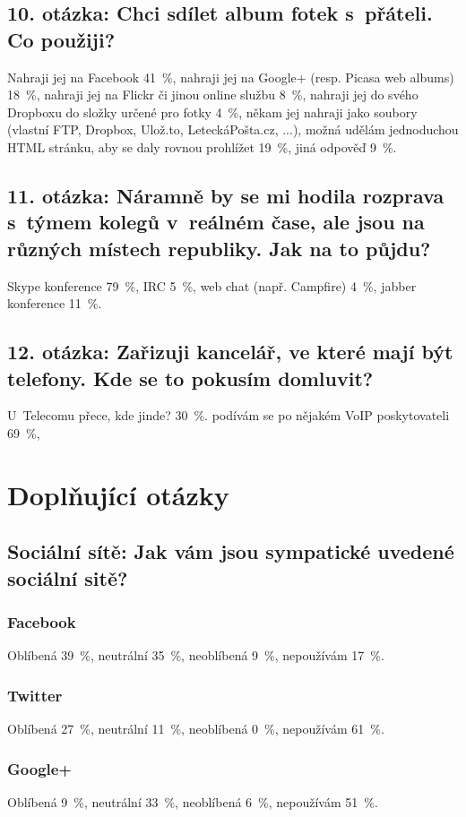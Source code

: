\documentclass[12pt,oneside,final]{fithesis2}
\begin{document}
\subsection*{10. otázka: Chci sdílet album fotek s~přáteli. Co použiji?}
Nahraji jej na Facebook 41~\%,
nahraji jej na Google+ (resp. Picasa web albums) 18~\%,
nahraji jej na Flickr či jinou online službu 8~\%,
nahraji jej do svého Dropboxu do složky určené pro fotky 4~\%,
někam jej nahraji jako soubory (vlastní FTP, Dropbox, Ulož.to, LeteckáPošta.cz, ...), možná udělám jednoduchou HTML stránku, aby se daly rovnou prohlížet 19~\%,
jiná odpověď 9~\%.

\subsection*{11. otázka: Náramně by se mi hodila rozprava s~týmem kolegů v~reálném čase, ale jsou na různých místech republiky. Jak na to půjdu?}
Skype konference 79~\%,
IRC 5~\%,
web chat (např. Campfire) 4~\%,
jabber konference 11~\%.

\subsection*{12. otázka: Zařizuji kancelář, ve které mají být telefony. Kde se to pokusím domluvit?}
U~Telecomu přece, kde jinde? 30~\%.
podívám se po nějakém VoIP poskytovateli 69~\%,


\section{Doplňující otázky}

\subsection*{Sociální sítě: Jak vám jsou sympatické uvedené sociální sitě?}
\subsubsection*{Facebook}
Oblíbená 39~\%,
neutrální 35~\%,
neoblíbená 9~\%,
nepoužívám 17~\%.

\subsubsection*{Twitter}
Oblíbená 27~\%,
neutrální 11~\%,
neoblíbená 0~\%,
nepoužívám 61~\%.

\subsubsection*{Google+}
Oblíbená 9~\%,
neutrální 33~\%,
neoblíbená 6~\%,
nepoužívám 51~\%.
\end{document}

